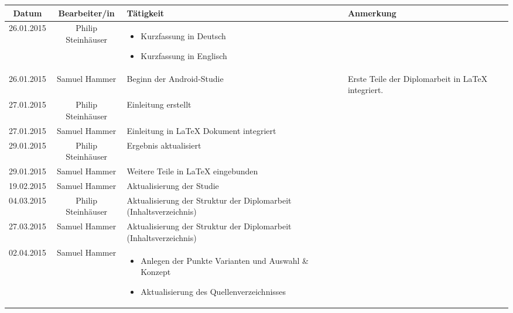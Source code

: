 \begin{table}
	\centering
	\begin{tabular}{| c | c | p{6cm} | p{4cm} |}
		\hline
		\textbf{Datum} & \textbf{Bearbeiter/in} & \textbf{Tätigkeit} & \textbf{Anmerkung}
		\\\hline %
		26.01.2015 
		&%
		Philip Steinhäuser
		&%
		\begin{itemize}
			\item Kurzfassung in Deutsch
			\item Kurzfassung in Englisch
		\end{itemize}
		&%
		\\\hline %
		26.01.2015
		&%
		Samuel Hammer
		&%
		Beginn der Android-Studie
		&%
		Erste Teile der Diplomarbeit in LaTeX integriert.
		\\\hline %
		27.01.2015
		&%
		Philip Steinhäuser
		&%
		Einleitung erstellt
		&%
		\\\hline %
		27.01.2015
		&%
		Samuel Hammer
		&%
		Einleitung in LaTeX Dokument integriert
		&%
		\\\hline %
		29.01.2015
		&%
		Philip Steinhäuser
		&%
		Ergebnis aktualisiert
		&%
		\\\hline %
		29.01.2015
		&%
		Samuel Hammer
		&%
		Weitere Teile in LaTeX eingebunden
		&%
		\\\hline %
		19.02.2015
		&%
		Samuel Hammer
		&%
		Aktualisierung der Studie
		&%
		\\\hline %
		04.03.2015
		&%
		Philip Steinhäuser
		&%
		Aktualisierung der Struktur der Diplomarbeit (Inhaltsverzeichnis)
		&%
		\\\hline %
		27.03.2015
		&%
		Samuel Hammer
		&%
		Aktualisierung der Struktur der Diplomarbeit (Inhaltsverzeichnis)
		&%
		\\\hline %
		02.04.2015
		&%
		Samuel Hammer
		&%
		\begin{itemize}
			\item Anlegen der Punkte Varianten und Auswahl \& Konzept
			\item Aktualisierung des Quellenverzeichnisses
		\end{itemize}
		&%
		\\\hline %

\end{tabular}
\end{table}
